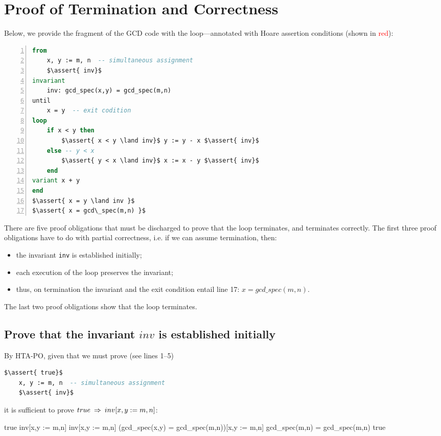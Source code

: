 \documentclass[runningheads,12pt]{article}
\newcommand{\e}[1]{\lstinline[language=eiffel]|#1|}
\def\assert#1{\textcolor{red}{ {\{} {#1} {\}}}}
\begin{document}
\section{Proof of Termination and Correctness}\label{proofs}

Below, we provide the fragment of the GCD code with the loop---annotated with Hoare assertion conditions (shown in \textcolor{red}{red}): 

\begin{lstlisting}[language=eiffel,numbers=left]
from
	x, y := m, n  -- simultaneous assignment
	$\assert{ inv}$
invariant 
	inv: gcd_spec(x,y) = gcd_spec(m,n)
until
	x = y  -- exit codition 
loop
	if x < y then
		$\assert{ x < y \land inv}$ y := y - x $\assert{ inv}$
	else -- y < x
		$\assert{ y < x \land inv}$ x := x - y $\assert{ inv}$
	end
variant x + y
end
$\assert{ x = y \land inv }$
$\assert{ x = gcd\_spec(m,n) }$
\end{lstlisting} 


There are five proof obligations that must be discharged to prove that the loop terminates, and terminates correctly. The first three proof obligations have to do with partial correctness, i.e. if we can assume termination, then:

\begin{itemize}
  \item the invariant \e{inv} is established initially;
  \item each execution of the loop preserves the invariant;
  \item thus, on termination the invariant and the exit condition entail line 17: $x = gcd\_spec(m,n)$.   
\end{itemize}

The last two proof obligations show that the loop terminates. 

\subsection{Prove that the invariant $inv$ is established initially}

By HTA-PO, given that we must prove (see lines 1--5)


\begin{lstlisting}[language=eiffel]
    $\assert{ true}$
    x, y := m, n  -- simultaneous assignment
    $\assert{ inv}$
\end{lstlisting} 


\noindent it is sufficient to prove $true \; \mathbin\Rightarrow \; inv[x,y := m,n]$:
\vspace{-6pt}
\begin{calculation}
	true \1\limp inv[x,y := m,n]
	inv[x,y := m,n]
	(gcd\_spec(x,y) = gcd\_spec(m,n))[x,y := m,n]
	gcd\_spec(m,n) = gcd\_spec(m,n)
	true \qquad\blacksquare
\end{calculation}
\end{document}
